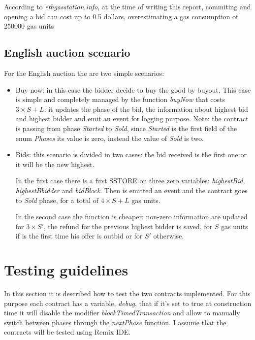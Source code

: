 \documentclass{article}
\begin{document}
According to \textit{ethgasstation.info}, at the time of writing
this report, commiting and opening a bid can cost up to 0.5 dollars, overestimating a gas consumption of 250000 gas units

\subsection{English auction scenario}
For the English auction the are two simple scenarios:
\begin{itemize}
    \item Buy now: in this case the bidder decide to buy the good by buyout. This case is simple and completely managed by the function \textit{buyNow} that costs $3\times S + L$: it updates the phase of the bid, the information about highest bid and highest bidder and emit an event for logging purpose. Note: the contract is passing from phase \textit{Started} to \textit{Sold}, since \textit{Started} is the first field of the enum \textit{Phases} its value is zero, instead the value of \textit{Sold} is two. 
    \item Bids: this scenario is divided in two cases: the bid received is the first one or it will be the new highest. 
    
    In the first case there is a first SSTORE on three zero variables: \textit{highestBid}, \textit{highestBbidder} and \textit{bidBlock}. Then is emitted an event and the contract goes to \textit{Sold} phase, for a total of $4 \times S + L$ gas units.
    
    In the second case the function is cheaper: non-zero information are updated for $3\times S'$, the refund for the previous highest bidder is saved, for $S$ gas units if is the first time his offer is outbid or for $S'$ otherwise.
\end{itemize}

\section{Testing guidelines}
In this section it is described how to test the two contracts implemented. For this purpose each contract has a variable, \textit{debug}, that if it's set to true at construction time it will disable the modifier \textit{blockTimedTransaction} and allow to manually switch between phases through the \textit{nextPhase} function. I assume that the contracts will be tested using Remix IDE.
\end{document}
